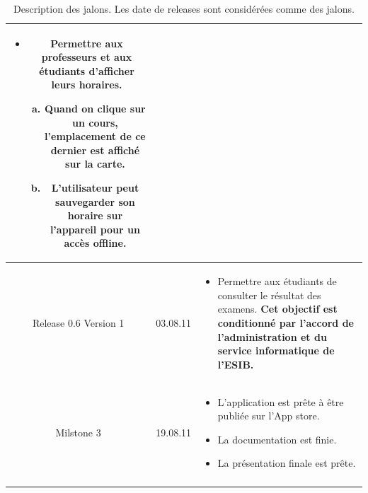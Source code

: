 \begin{longtable}{|c|l|p{10cm}|}
 	 		 	\begin{itemize}
 	 		 	 		\item Permettre aux professeurs et aux étudiants d'afficher leurs horaires.
 		 		 	 	\begin{enumerate}[a)]
 		 		 	 			\item Quand on clique sur un cours, l'emplacement de ce dernier est affiché sur la carte.
 		 		 	 			\item L'utilisateur peut sauvegarder son horaire sur l'appareil pour un accès offline.
 		 		 	 		\end{enumerate}
 	 		 	\end{itemize}   \\ 
	 	\hline  Release 0.6 Version 1 & 03.08.11  & 
 		 	\begin{itemize}
 		 	 		\item Permettre aux étudiants de consulter le résultat des examens. \textbf{Cet objectif est conditionné par l'accord de l'administration et du service informatique de l'\gls{ESIB}.}
 		 	\end{itemize}   \\  
	 	\hline  Milstone 3 &  19.08.11 &
	  		 	\begin{itemize}
	  		 	 		\item L'application est prête à être publiée sur l'App store.
	  		 	 		\item La documentation est finie.
	  		 	 		\item La présentation finale est prête.
	  		 	\end{itemize}   \\  
		 \hline 
		\caption{\label{tab.DescMils}Description des jalons. Les date de releases sont considérées comme des jalons.}  \\
	 \end{longtable} 

